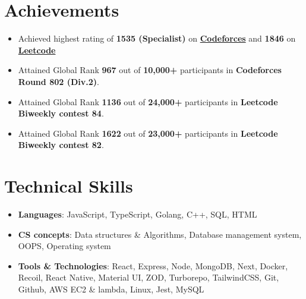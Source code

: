 \documentclass[letterpaper,11pt]{article}
\newcommand{\resumeItem}[1]{
  \item\small{
    {#1 \vspace{-2pt}}
  }
}
\newcommand{\resumeSubHeadingListStart}{\begin{itemize}[leftmargin=0.15in, label={}]}
\newcommand{\resumeSubHeadingListEnd}{\end{itemize}}
\newcommand{\resumeItemListStart}{\begin{itemize}}
\newcommand{\resumeItemListEnd}{\end{itemize}\vspace{-5pt}}
\begin{document}
\section{Achievements}
    \resumeSubHeadingListStart
           \resumeItemListStart
            \resumeItem{Achieved highest rating of \textbf{1535 (Specialist)} on \href{https://codeforces.com/profile/PRESAAN_}{\color{blue}\textbf{Codeforces}} and \textbf{1846} on \href{https://leetcode.com/abhinav_singh_01/}{\color{blue}\textbf{Leetcode}}}
             \resumeItem{Attained Global Rank \textbf{967} out of \textbf{10,000+} participants in \textbf{Codeforces Round 802 (Div.2)}.}
            \resumeItem{Attained Global Rank \textbf{1136} out of \textbf{24,000+} participants in \textbf{Leetcode Biweekly contest 84}.}
            \resumeItem{Attained Global Rank \textbf{1622} out of \textbf{23,000+} participants in \textbf{Leetcode Biweekly contest 82}.}
           \resumeItemListEnd
    \resumeSubHeadingListEnd





\section{Technical Skills}
    \resumeSubHeadingListStart
           \resumeItemListStart
     \resumeItem{\textbf{Languages}{: JavaScript, TypeScript, Golang, C++, SQL, HTML}}
     \resumeItem{\textbf{CS concepts}{: Data structures \& Algorithms, Database management system, OOPS, Operating system }}
     \resumeItem{\textbf{Tools \& Technologies}{: React, Express, Node, MongoDB, Next, Docker, Recoil, React Native, Material UI, ZOD, Turborepo, TailwindCSS, Git, Github, AWS EC2 \& lambda, Linux, Jest, MySQL}}
                \resumeItemListEnd
    \resumeSubHeadingListEnd


\end{document}
